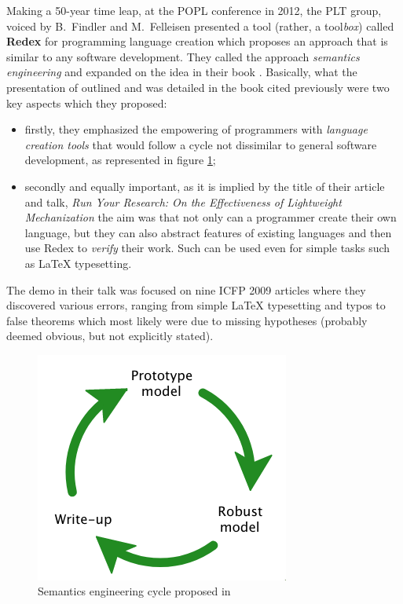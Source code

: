 Making a 50-year time leap, at the POPL conference in 2012, the PLT
group, voiced by B.\ Findler and M.\ Felleisen presented a tool (rather,
a tool\emph{box}) called \textbf{Redex} for programming language creation
which proposes an approach that is similar to any software development.
They called the approach \emph{semantics engineering} and expanded on
the idea in their book \cite{sewpr}. Basically, what the presentation
of \cite{popl} outlined and was detailed in the book cited previously
were two key aspects which they proposed:
\begin{itemize}
\item firstly, they emphasized the empowering of programmers with \emph{language
  creation tools} that would follow a cycle not dissimilar to general software
  development, as represented in figure \ref{fig:sem-eng};
\item secondly and equally important, as it is implied by the title of their
  article and talk, \emph{Run Your Research: On the Effectiveness of %
    Lightweight Mechanization} the aim was that not only can a programmer create
  their own language, but they can also abstract features of existing languages
  and then use Redex to \emph{verify} their work. Such  can be used even for simple tasks such as \LaTeX{}
  typesetting.
\end{itemize}

The demo in their talk was focused on nine ICFP 2009 articles where they
discovered various errors, ranging from simple \LaTeX{} typesetting and typos
to false theorems which most likely were due to missing hypotheses (probably
deemed obvious, but not explicitly stated).

\begin{figure}[!htb]
  \centering
  \includegraphics[scale=0.6]{fig/sem-eng.png}
  \caption{Semantics engineering cycle proposed in \cite{popl}}
  \label{fig:sem-eng}
\end{figure}

